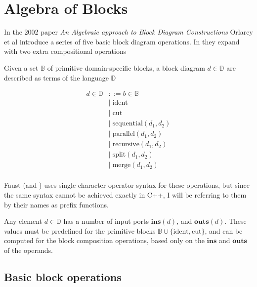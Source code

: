 \chapter{Algebra of Blocks}

\newcommand{\Ident}{\ensuremath{\textrm{ident}}}
\newcommand{\Cut}{\ensuremath{\textrm{cut}}}
\newcommand{\Sequential}{\ensuremath{\textrm{sequential}}}
\newcommand{\Parallel}{\ensuremath{\textrm{parallel}}}
\newcommand{\Recursive}{\ensuremath{\textrm{recursive}}}
\newcommand{\Split}{\ensuremath{\textrm{split}}}
\newcommand{\Merge}{\ensuremath{\textrm{merge}}}
\newcommand{\Ins}{\ensuremath{\textbf{ins}}}
\newcommand{\Outs}{\ensuremath{\textbf{outs}}}

In the 2002 paper \emph{An Algebraic approach to Block Diagram Constructions}\autocite{orlaray2002} Orlarey et al introduce a series of five basic block diagram operations. In \autocite{orlarey2004} they expand with two extra compositional operations

Given a set $\mathbb{B}$ of primitive domain-specific blocks, a block diagram $d \in \mathbb{D}$ are described as terms of the language $\mathbb{D}$

\begin{align*}
    d\in \mathbb{D} &::= b \in \mathbb{B} \\
    &|\; \Ident \\
    &|\; \Cut \\
    &|\; \Sequential(d_1, d_2) \\
    &|\; \Parallel(d_1, d_2) \\
    &|\; \Recursive(d_1, d_2) \\
    &|\; \Split(d_1, d_2) \\
    &|\; \Merge(d_1, d_2) \\
\end{align*}

Faust (and \autocite{orlaray2002}) uses single-character operator syntax for these operations, but since the same syntax cannot be achieved exactly in C++, I will be referring to them by their names as prefix functions.

Any element $d \in \mathbb{D}$ has a number of input ports $\Ins(d)$, and $\Outs(d)$. These values must be predefined for the primitive blocks $\mathbb{B} \cup \{\Ident, \Cut\}$, and can be computed for the block composition operations, based only on the $\Ins$ and $\Outs$ of the operands.

\section{Basic block operations}

